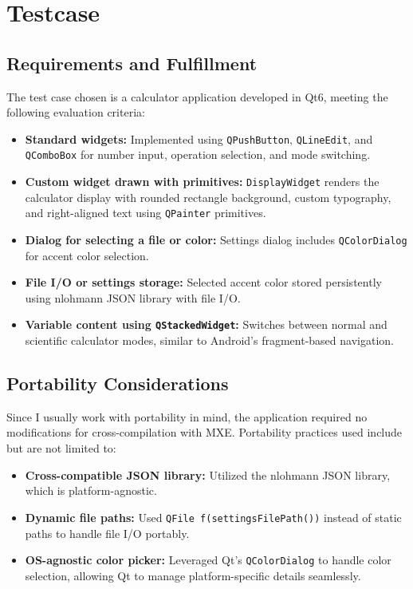 \documentclass{report}
\begin{document}
\chapter{Testcase}

\section{Requirements and Fulfillment}

The test case chosen is a calculator application developed in Qt6, meeting the following evaluation criteria:

\begin{itemize}
  \item \textbf{Standard widgets:} Implemented using \texttt{QPushButton}, \texttt{QLineEdit}, and \texttt{QComboBox} for number input, operation selection, and mode switching.
  \item \textbf{Custom widget drawn with primitives:} \texttt{DisplayWidget} renders the calculator display with rounded rectangle background, custom typography, and right-aligned text using \texttt{QPainter} primitives.
  \item \textbf{Dialog for selecting a file or color:} Settings dialog includes \texttt{QColorDialog} for accent color selection.
  \item \textbf{File I/O or settings storage:} Selected accent color stored persistently using nlohmann JSON library with file I/O.
  \item \textbf{Variable content using \texttt{QStackedWidget}:} Switches between normal and scientific calculator modes, similar to Android's fragment-based navigation.
\end{itemize}

\section{Portability Considerations}

Since I usually work with portability in mind, the application required no modifications for cross-compilation with MXE. Portability practices used include but are not limited to:

\begin{itemize}
  \item \textbf{Cross-compatible JSON library:} Utilized the nlohmann JSON library, which is platform-agnostic.
  \item \textbf{Dynamic file paths:} Used \texttt{QFile f(settingsFilePath())} instead of static paths to handle file I/O portably.
  \item \textbf{OS-agnostic color picker:} Leveraged Qt's \texttt{QColorDialog} to handle color selection, allowing Qt to manage platform-specific details seamlessly.
\end{itemize}
\end{document}
